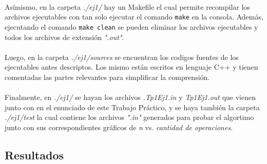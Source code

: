 \paragraph{}
Asímismo, en la carpeta \textit{./ej1/} hay un Makefile el cual permite recompilar los archivos ejecutables con tan solo ejecutar el comando \texttt{make} en la consola. Además, ejecutando el comando \texttt{make clean} se pueden eliminar los archivos ejecutables y todos los archivos de extensión \textit{".out"}.

\paragraph{}
Luego, en la carpeta \textit{./ej1/sources} se encuentran los codigos fuentes de los ejecutables antes descriptos. Los mismo están escritos en lenguaje C++ y tienen comentadas las partes relevantes para simplificar la comprensión.

\paragraph{}
Finalmente, en \textit{./ej1/} se hayan los archivos \textit{.Tp1Ej1.in} y \textit{Tp1Ej1.out} que vienen junto con en el enunciado de este Trabajo Práctico, y se haya también la carpeta \textit{./ej1/test} la cual contiene los archivos \textit{".in"} generados para probar el algortimo junto con sus correspondientes gráficos de \textit{n} vs. \textit{cantidad de operaciones}.


\subsection{Resultados}

